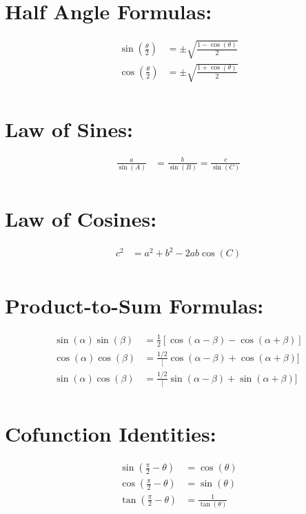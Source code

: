 \documentclass[twocolumn]{article}
\begin{document}
\section*{Half Angle Formulas:}
\begin{align*}
    \sin\left(\frac{\theta}{2}\right) &= \pm \sqrt{\frac{1 - \cos(\theta)}{2}} \\
    \cos\left(\frac{\theta}{2}\right) &= \pm \sqrt{\frac{1 + \cos(\theta)}{2}} \\
\end{align*}

\section*{Law of Sines:}
\begin{align*}
    \frac{a}{\sin(A)} &= \frac{b}{\sin(B)} = \frac{c}{\sin(C)} \\
\end{align*}

\section*{Law of Cosines:}
\begin{align*}
    c^2 &= a^2 + b^2 - 2ab\cos(C) \\
\end{align*}

\section*{Product-to-Sum Formulas:}
\begin{align*}
    \sin(\alpha)\sin(\beta) &= \frac{1}{2}[\cos(\alpha - \beta) - \cos(\alpha + \beta)] \\
    \cos(\alpha)\cos(\beta) &= \frac{1/2}[\cos(\alpha - \beta) + \cos(\alpha + \beta)] \\
    \sin(\alpha)\cos(\beta) &= \frac{1/2}[\sin(\alpha - \beta) + \sin(\alpha + \beta)] \\
\end{align*}

\section*{Cofunction Identities:}
\begin{align*}
    \sin\left(\frac{\pi}{2} - \theta\right) &= \cos(\theta) \\
    \cos\left(\frac{\pi}{2} - \theta\right) &= \sin(\theta) \\
    \tan\left(\frac{\pi}{2} - \theta\right) &= \frac{1}{\tan(\theta)} \\
\end{align*}
\end{document}
